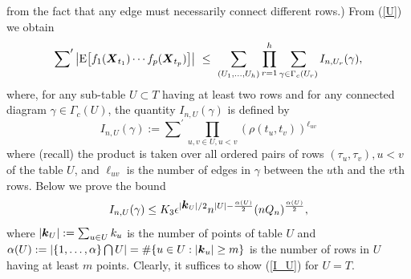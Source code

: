 \documentclass[10pt]{article}
\def\E{\mathrm E}
\newcommand{\mbf}[1]{\mbox{\boldmath $#1$}}
\begin{document}
from the fact that any edge must necessarily connect different
rows.)   From (\ref{U}) we obtain
\begin{equation}
\sum\nolimits^\prime \big|\E \big[f_1({\mbf X}_{t_1}) \cdots  f_p({\mbf
X}_{t_p})\big] \big|  \ \le \  \sum_{(U_1, \dots, U_h)} \prod_{r=1}^h
\sum_{\gamma \in \Gamma_c(U_r)} I_{n,U_r}(\gamma), \label{G_I}
\end{equation}
where, for any sub-table $U \subset T $ having at least two rows
and for any connected diagram $\gamma \in \Gamma_c(U)$,  the
quantity $I_{n,U}(\gamma)$ is defined by
$$
I_{n,U}(\gamma) :=    \sum\nolimits^\prime \prod_{u,v \in U, u<v}
(\rho (t_u,t_v))^{\ell_{uv}}
$$
where (recall) the product is taken over all ordered pairs of rows
$(\tau_u, \tau_v), u<v $ of the table $U$, and $\ell_{uv}$ is the
number of edges in $\gamma $ between the $u$th and the $v$th rows.
Below we  prove the bound
\begin{equation}
I_{n,U}(\gamma) \le K_3 \epsilon^{|{\mbf
k}_U|/2}n^{|U|-\frac{\alpha(U)}{2}} (n Q_n)^{\frac{\alpha(U)}{2}},
\label{I_U}
\end{equation}
where $|{\mbf k}_U| := \sum_{u\in U} k_u $ is the number of points
of table $U$ and  $\alpha(U) := |\{1, \dots, \alpha\} \bigcap U| =
\# \{u\in U: |{\mbf k}_u| \ge m \} $ is the number of rows in $U$
having at least $m$ points. Clearly, it suffices to show
(\ref{I_U}) for $U=T$.
\end{document}
